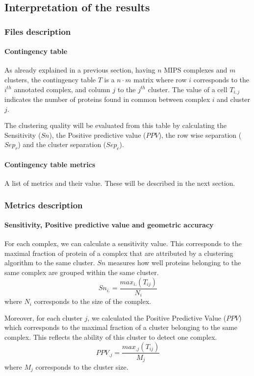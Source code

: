 \subsection{Interpretation of the results}
\subsubsection{Files description}
\paragraph{Contingency table}
As already explained in a previous section, having $n$ MIPS complexes and $m$ clusters, the contingency table $T$ is
a $n \cdot m$ matrix where row $i$ corresponds to the $i^{th}$
annotated complex, and column $j$ to the $j^{th}$ cluster. The value
of a cell $T_{i,j}$ indicates the number of proteins found in common
between complex $i$ and cluster $j$.

The clustering quality will be evaluated from this table by calculating the Sensitivity ($Sn$), the Positive predictive
value ($PPV$), the row wise separation ($Sep_{r}$) and the cluster separation ($Sep_{c}$).

\paragraph{Contingency table metrics}
  A list of metrics and their value. These will be described in the next section.

\subsubsection{Metrics description}
\paragraph{Sensitivity, Positive predictive value and geometric accuracy}

For each complex, we can calculate a sensitivity value. This corresponds to the maximal fraction of protein of a complex that are attributed by a clustering algorithm to the same cluster. $Sn$ measures how well proteins belonging to the same complex are grouped within the same cluster.
\[Sn_{i.}=\frac{max_{i.}(T_{ij})}{N_i}\]
where $N_i$ corresponds to the size of the complex.

Moreover, for each cluster $j$, we calculated the Positive Predictive Value ($PPV$) which corresponds to the maximal fraction of a cluster belonging to the same complex. This reflects the ability of this cluster to detect one complex.
\[PPV_{.j}=\frac{max_{.j}(T_{ij})}{M_j}\]
where $M_j$ corresponds to the cluster size.

